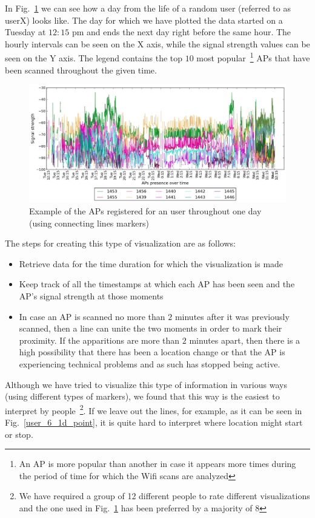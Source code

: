 In Fig.~\ref{user_6_1d_lines} we can see how a day from the life of a random
user (referred to as userX) looks like. The day for which we have plotted the
data started on a Tuesday at $12:15$ pm and ends the next day right before the
same hour. The hourly intervals can be seen on the X axis, while the signal
strength values can be seen on the Y axis. The legend contains the top $10$ most
popular~\footnote{An AP is more popular than another in case it appears more
times during the period of time for which the Wifi scans are analyzed} APs that
have been scanned throughout the given time.

\begin{figure}[h]
\centering
\includegraphics[width
=\textwidth, height =
0.4\textwidth]{figures/user_6_sorted_1days_plot.png}
\caption{Example of the APs registered for an user throughout one day (using
connecting lines markers)}
\label{user_6_1d_lines}
\end{figure}

The steps for creating this type of visualization are as follows:
\begin{itemize}
  \item Retrieve data for the time duration for which the visualization is made
  \item Keep track of all the timestamps at which each AP has been seen and the
  AP's signal strength at those moments
  \item In case an AP is scanned no more than $2$ minutes after it was
  previously scanned, then a line can unite the two moments in order to mark
  their proximity. If the apparitions are more than $2$ minutes apart, then
  there is a high possibility that there has been a location change or that the
  AP is experiencing technical problems and as such has stopped being active.
\end{itemize}

Although we have tried to visualize this type of information in various ways
(using different types of markers), we found that this way is the easiest to
interpret by people~\footnote{We have required a group of 12 different people to
rate different visualizations and the one used in Fig.~\ref{user_6_1d_lines} has
been preferred by a majority of 8}. If we leave out the lines, for example, as
it can be seen in Fig.~\ref{user_6_1d_point}, it is quite hard to interpret
where location might start or stop.

